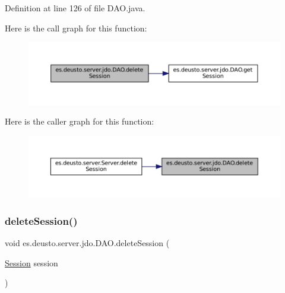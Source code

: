Definition at line 126 of file D\+A\+O.\+java.

Here is the call graph for this function\+:
\nopagebreak
\begin{figure}[H]
\begin{center}
\leavevmode
\includegraphics[width=350pt]{classes_1_1deusto_1_1server_1_1jdo_1_1_d_a_o_a399605bc2a2fd86679ddf7793b71de12_cgraph}
\end{center}
\end{figure}
Here is the caller graph for this function\+:
\nopagebreak
\begin{figure}[H]
\begin{center}
\leavevmode
\includegraphics[width=350pt]{classes_1_1deusto_1_1server_1_1jdo_1_1_d_a_o_a399605bc2a2fd86679ddf7793b71de12_icgraph}
\end{center}
\end{figure}
\mbox{\label{classes_1_1deusto_1_1server_1_1jdo_1_1_d_a_o_aa4010f98d33fbdb583bb361ab576ff2d}} 
\subsubsection{\texorpdfstring{deleteSession()}{deleteSession()}\hspace{0.1cm}{\footnotesize\ttfamily [2/2]}}
{\footnotesize\ttfamily void es.\+deusto.\+server.\+jdo.\+D\+A\+O.\+delete\+Session (\begin{DoxyParamCaption}\item[{\mbox{\hyperlink{classes_1_1deusto_1_1server_1_1jdo_1_1_session}{Session}}}]{session }\end{DoxyParamCaption})}



